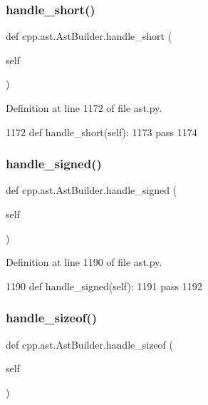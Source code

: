 \subsubsection{\texorpdfstring{handle\+\_\+short()}{handle\_short()}}
{\footnotesize\ttfamily def cpp.\+ast.\+Ast\+Builder.\+handle\+\_\+short (\begin{DoxyParamCaption}\item[{}]{self }\end{DoxyParamCaption})}



Definition at line 1172 of file ast.\+py.


\begin{DoxyCode}
1172     \textcolor{keyword}{def }handle\_short(self):
1173         \textcolor{keywordflow}{pass}
1174 
\end{DoxyCode}
\mbox{\label{classcpp_1_1ast_1_1AstBuilder_a61c1e82b2b4fdc337cf360e485851390}} 
\subsubsection{\texorpdfstring{handle\+\_\+signed()}{handle\_signed()}}
{\footnotesize\ttfamily def cpp.\+ast.\+Ast\+Builder.\+handle\+\_\+signed (\begin{DoxyParamCaption}\item[{}]{self }\end{DoxyParamCaption})}



Definition at line 1190 of file ast.\+py.


\begin{DoxyCode}
1190     \textcolor{keyword}{def }handle\_signed(self):
1191         \textcolor{keywordflow}{pass}
1192 
\end{DoxyCode}
\mbox{\label{classcpp_1_1ast_1_1AstBuilder_acfd733ff9115e3292bea10e160bb6184}} 
\subsubsection{\texorpdfstring{handle\+\_\+sizeof()}{handle\_sizeof()}}
{\footnotesize\ttfamily def cpp.\+ast.\+Ast\+Builder.\+handle\+\_\+sizeof (\begin{DoxyParamCaption}\item[{}]{self }\end{DoxyParamCaption})}



